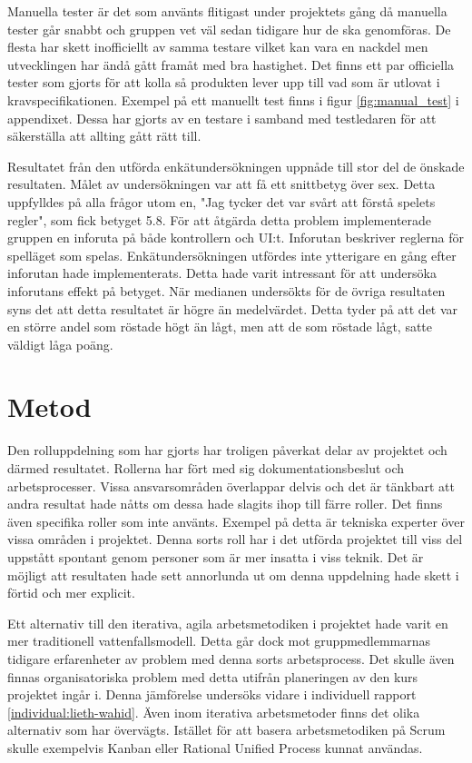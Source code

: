 Manuella tester är det som använts flitigast under projektets gång då manuella tester går snabbt och gruppen vet väl sedan tidigare hur de ska genomföras. De flesta har skett inofficiellt av samma testare vilket kan vara en nackdel men utvecklingen har ändå gått framåt med bra hastighet. Det finns ett par officiella tester som gjorts för att kolla så produkten lever upp till vad som är utlovat i kravspecifikationen. Exempel på ett manuellt test finns i figur \ref{fig:manual_test} i appendixet. Dessa har gjorts av en testare i samband med testledaren för att säkerställa att allting gått rätt till.

Resultatet från den utförda enkätundersökningen uppnåde till stor del de önskade resultaten. Målet av undersökningen var att få ett snittbetyg över sex. Detta uppfylldes på alla frågor utom en, "Jag tycker det var svårt att förstå spelets regler", som fick betyget 5.8. För att åtgärda detta problem implementerade gruppen en inforuta på både kontrollern och UI:t. Inforutan beskriver reglerna för spelläget som spelas. Enkätundersökningen utfördes inte ytterigare en gång efter inforutan hade implementerats. Detta hade varit intressant för att undersöka inforutans effekt på betyget. När medianen undersökts för de övriga resultaten syns det att detta resultatet är högre än medelvärdet. Detta tyder på att det var en större andel som röstade högt än lågt, men att de som röstade lågt, satte väldigt låga poäng.

\section{Metod}
\label{sec:discussion-method}
Den rolluppdelning som har gjorts har troligen påverkat delar av projektet och därmed resultatet. Rollerna har fört med sig dokumentationsbeslut och arbetsprocesser. Vissa ansvarsområden överlappar delvis och det är tänkbart att andra resultat hade nåtts om dessa hade slagits ihop till färre roller. Det finns även specifika roller som inte använts. Exempel på detta är tekniska experter över vissa områden i projektet. Denna sorts roll har i det utförda projektet till viss del uppstått spontant genom personer som är mer insatta i viss teknik. Det är möjligt att resultaten hade sett annorlunda ut om denna uppdelning hade skett i förtid och mer explicit.

Ett alternativ till den iterativa, agila arbetsmetodiken i projektet hade varit en mer traditionell vattenfallsmodell. Detta går dock mot gruppmedlemmarnas tidigare erfarenheter av problem med denna sorts arbetsprocess. Det skulle även finnas organisatoriska problem med detta utifrån planeringen av den kurs projektet ingår i. Denna jämförelse undersöks vidare i individuell rapport \ref{individual:lieth-wahid}. Även inom iterativa arbetsmetoder finns det olika alternativ som har övervägts. Istället för att basera arbetsmetodiken på Scrum skulle exempelvis Kanban \cite{kanban} eller Rational Unified Process \cite{RUP} kunnat användas.

